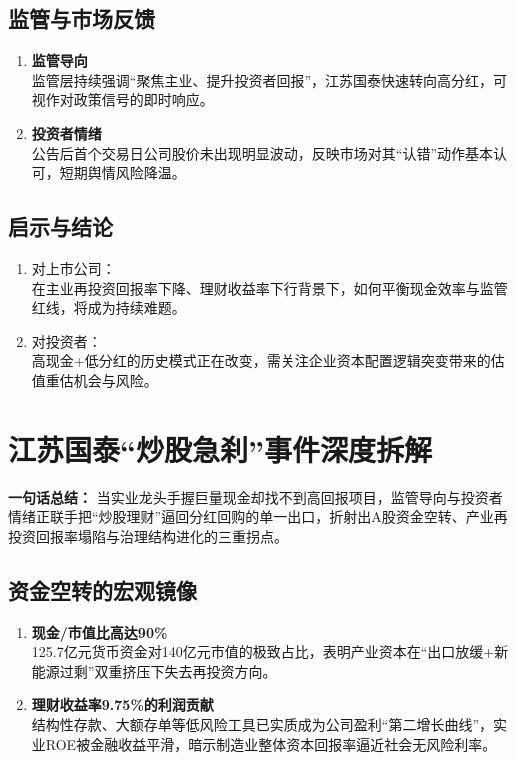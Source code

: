 \subsection{监管与市场反馈}
\begin{enumerate}[leftmargin=*, nosep]
    \item \textbf{监管导向}  \\
    监管层持续强调“聚焦主业、提升投资者回报”，江苏国泰快速转向高分红，可视作对政策信号的即时响应。
    \item \textbf{投资者情绪}  \\
    公告后首个交易日公司股价未出现明显波动，反映市场对其“认错”动作基本认可，短期舆情风险降温。
\end{enumerate}

\subsection{启示与结论}
\begin{enumerate}[leftmargin=*, nosep]
    \item 对上市公司：  \\
    在主业再投资回报率下降、理财收益率下行背景下，如何平衡现金效率与监管红线，将成为持续难题。
    \item 对投资者：  \\
    高现金+低分红的历史模式正在改变，需关注企业资本配置逻辑突变带来的估值重估机会与风险。
\end{enumerate}


\clearpage

\section{江苏国泰“炒股急刹”事件深度拆解}
\textbf{一句话总结：}  
当实业龙头手握巨量现金却找不到高回报项目，监管导向与投资者情绪正联手把“炒股理财”逼回分红回购的单一出口，折射出A股资金空转、产业再投资回报率塌陷与治理结构进化的三重拐点。

\subsection{资金空转的宏观镜像}
\begin{enumerate}[leftmargin=*, nosep]
    \item \textbf{现金/市值比高达90\%}  \\
    125.7亿元货币资金对140亿元市值的极致占比，表明产业资本在“出口放缓+新能源过剩”双重挤压下失去再投资方向。  
    \item \textbf{理财收益率9.75\%的利润贡献}  \\
    结构性存款、大额存单等低风险工具已实质成为公司盈利“第二增长曲线”，实业ROE被金融收益平滑，暗示制造业整体资本回报率逼近社会无风险利率。
\end{enumerate}

